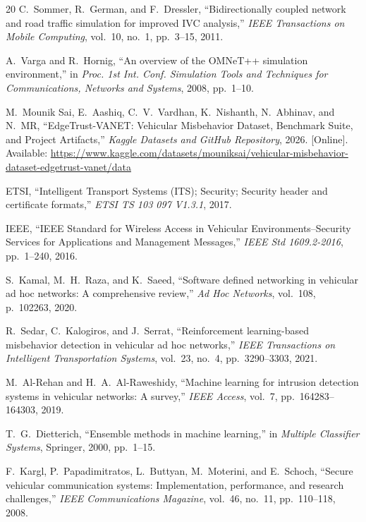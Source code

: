 \documentclass[conference]{IEEEtran}
\begin{document}
\begin{thebibliography}{20}
C.~Sommer, R.~German, and F.~Dressler,
``Bidirectionally coupled network and road traffic simulation for improved IVC analysis,''
\textit{IEEE Transactions on Mobile Computing}, vol.~10, no.~1, pp.~3--15, 2011.

A.~Varga and R.~Hornig,
``An overview of the OMNeT++ simulation environment,''
in \textit{Proc. 1st Int. Conf. Simulation Tools and Techniques for Communications, Networks and Systems}, 2008, pp.~1--10.

M.~Mounik Sai, E.~Aashiq, C.~V.~Vardhan, K.~Nishanth, N.~Abhinav, and N.~MR,
``EdgeTrust-VANET: Vehicular Misbehavior Dataset, Benchmark Suite, and Project Artifacts,''
\textit{Kaggle Datasets and GitHub Repository}, 2026. [Online]. Available: \url{https://www.kaggle.com/datasets/mouniksai/vehicular-misbehavior-dataset-edgetrust-vanet/data}

ETSI,
``Intelligent Transport Systems (ITS); Security; Security header and certificate formats,''
\textit{ETSI TS 103 097 V1.3.1}, 2017.

IEEE,
``IEEE Standard for Wireless Access in Vehicular Environments--Security Services for Applications and Management Messages,''
\textit{IEEE Std 1609.2-2016}, pp.~1--240, 2016.

S.~Kamal, M.~H.~Raza, and K.~Saeed,
``Software defined networking in vehicular ad hoc networks: A comprehensive review,''
\textit{Ad Hoc Networks}, vol.~108, p.~102263, 2020.

R.~Sedar, C.~Kalogiros, and J.~Serrat,
``Reinforcement learning-based misbehavior detection in vehicular ad hoc networks,''
\textit{IEEE Transactions on Intelligent Transportation Systems}, vol.~23, no.~4, pp.~3290--3303, 2021.

M.~Al-Rehan and H.~A.~Al-Raweshidy,
``Machine learning for intrusion detection systems in vehicular networks: A survey,''
\textit{IEEE Access}, vol.~7, pp.~164283--164303, 2019.

T.~G.~Dietterich,
``Ensemble methods in machine learning,''
in \textit{Multiple Classifier Systems}, Springer, 2000, pp.~1--15.

F.~Kargl, P.~Papadimitratos, L.~Buttyan, M.~Moterini, and E.~Schoch,
``Secure vehicular communication systems: Implementation, performance, and research challenges,''
\textit{IEEE Communications Magazine}, vol.~46, no.~11, pp.~110--118, 2008.

\end{thebibliography}
\end{document}
